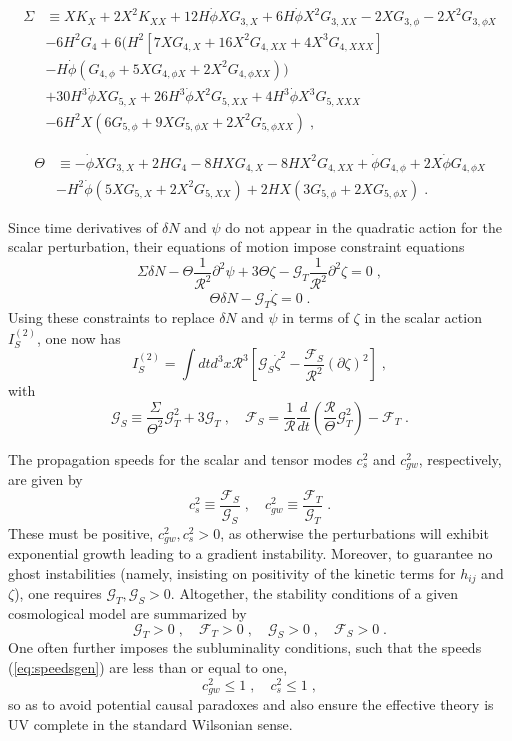 \documentclass[amsmath,amssymb,11pt]{article}
\newcommand{\beq}{\begin{equation}}
\newcommand{\eeq}{\end{equation}}
\begin{document}
\beq\label{Sigma}
\begin{split}
\Sigma&\equiv XK_{X}+2X^{2}K_{XX}+12 H\dot{\phi}XG_{3,X}+6H\dot{\phi}X^{2}G_{3,XX}-2XG_{3,\phi}-2X^{2}G_{3,\phi X}\\
&-6H^{2}G_{4}+6\biggr(H^{2}[7XG_{4,X}+16 X^{2}G_{4,XX}+4X^{3}G_{4,XXX}]\\
&-H\dot{\phi}(G_{4,\phi}+5XG_{4,\phi X}+2X^{2}G_{4,\phi XX})\biggr)\\
&+30 H^{3}\dot{\phi} XG_{5,X}+26 H^{3}\dot{\phi}X^{2}G_{5,XX}+4H^{3}\dot{\phi}X^{3}G_{5,XXX}\\
&-6H^{2}X(6G_{5,\phi}+9XG_{5,\phi X}+2X^{2}G_{5,\phi XX})\;,
\end{split}
\eeq

\beq 
\begin{split}
\Theta&\equiv -\dot{\phi}XG_{3,X}+2HG_{4}-8HX G_{4,X}-8H X^{2}G_{4,XX}+\dot{\phi}G_{4,\phi}+2X\dot{\phi}G_{4,\phi X}\\
&-H^{2}\dot{\phi}(5X G_{5,X}+2X^{2} G_{5,XX})+2HX(3G_{5,\phi}+2XG_{5,\phi X})\;.
\end{split}
\eeq

Since time derivatives of $\delta N$ and $\psi$ do not appear in the quadratic action for the scalar perturbation, their equations of motion impose constraint equations
\beq \Sigma\delta N-\Theta\frac{1}{\mathcal{R}^{2}}\partial^{2}\psi+3\Theta\zeta-\mathcal{G}_{T}\frac{1}{\mathcal{R}^{2}}\partial^{2}\zeta=0\;,\eeq
\beq \Theta\delta N-\mathcal{G}_{T}\dot{\zeta}=0\;.\eeq
Using these constraints to replace $\delta N$ and $\psi$ in terms of $\zeta$ in the scalar action $I^{(2)}_{S}$, one now has
\beq I^{(2)}_{S}=\int dt d^{3}x\mathcal{R}^{3}\left[\mathcal{G}_{S}\dot{\zeta}^{2}-\frac{\mathcal{F}_{S}}{\mathcal{R}^{2}}(\partial\zeta)^{2}\right]\;,\eeq
with
\beq \label{FsGs}
 \mathcal{G}_{S}\equiv\frac{\Sigma}{\Theta^{2}}\mathcal{G}^{2}_{T}+3\mathcal{G}_{T}\;,\quad \mathcal{F}_{S}=\frac{1}{\mathcal{R}}\frac{d}{dt}\left(\frac{\mathcal{R}}{\Theta}\mathcal{G}_{T}^{2}\right)-\mathcal{F}_{T}\;.\eeq

The propagation speeds for the scalar and tensor modes $c_{s}^{2}$ and $c^{2}_{gw}$, respectively, are given by 
\beq c_{s}^{2}\equiv\frac{\mathcal{F}_{S}}{\mathcal{G}_{S}}\;,\quad c_{gw}^2 \equiv\frac{\mathcal{F}_{T}}{\mathcal{G}_{T}}\;.\label{eq:speedsgen}\eeq
These must be positive, $c_{gw}^{2},c_{s}^{2}>0$, as otherwise the perturbations will exhibit exponential growth leading to a gradient instability. Moreover, to guarantee no ghost instabilities (namely, insisting on positivity of the kinetic terms for $h_{ij}$ and $\zeta$), one requires $\mathcal{G}_{T},\mathcal{G}_{S}>0$. Altogether, the stability conditions of a given cosmological model are summarized by 
\beq \mathcal{G}_{T}>0\;,\quad \mathcal{F}_{T}>0\;,\quad \mathcal{G}_{S}>0\;,\quad \mathcal{F}_{S}>0\;.\eeq
One often further imposes the subluminality conditions, such that the speeds (\ref{eq:speedsgen}) are less than or equal to one,
\beq c_{gw}^{2}\leq1\;,\quad c_{s}^{2}\leq1\;,\eeq
so as to avoid potential causal paradoxes and also ensure the effective theory is UV complete in the standard Wilsonian sense. 
\end{document}
